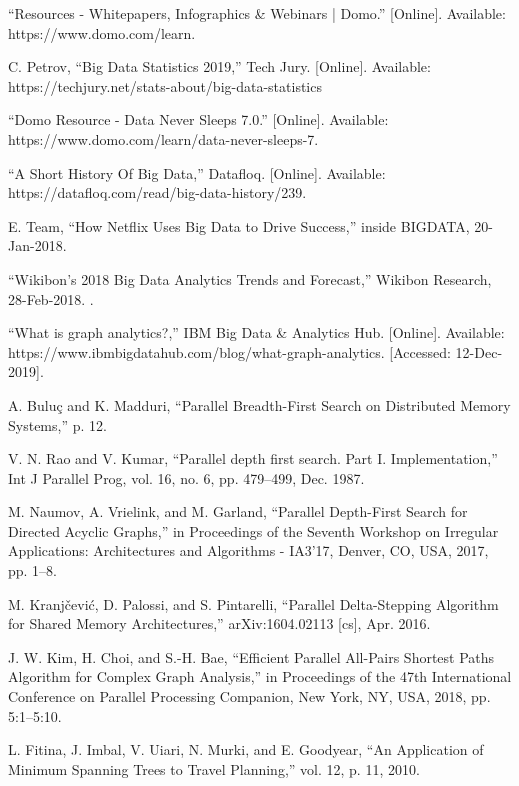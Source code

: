\documentclass[journal,twoside,web]{ieeecolor}
\begin{document}
\begin{thebibliography}{9}
    “Resources - Whitepapers, Infographics \& Webinars | Domo.” [Online]. Available: https://www.domo.com/learn.
    
    C. Petrov, “Big Data Statistics 2019,” Tech Jury. [Online]. Available: https://techjury.net/stats-about/big-data-statistics
    
    “Domo Resource - Data Never Sleeps 7.0.” [Online]. Available: https://www.domo.com/learn/data-never-sleeps-7.
    
    “A Short History Of Big Data,” Datafloq. [Online]. Available: https://datafloq.com/read/big-data-history/239.
    
    E. Team, “How Netflix Uses Big Data to Drive Success,” inside BIGDATA, 20-Jan-2018.
    
    “Wikibon’s 2018 Big Data Analytics Trends and Forecast,” Wikibon Research, 28-Feb-2018. .
    
    “What is graph analytics?,” IBM Big Data \& Analytics Hub. [Online]. Available: https://www.ibmbigdatahub.com/blog/what-graph-analytics. [Accessed: 12-Dec-2019].
    
    A. Buluç and K. Madduri, “Parallel Breadth-First Search on Distributed Memory Systems,” p. 12.
    
    V. N. Rao and V. Kumar, “Parallel depth first search. Part I. Implementation,” Int J Parallel Prog, vol. 16, no. 6, pp. 479–499, Dec. 1987.
    
    M. Naumov, A. Vrielink, and M. Garland, “Parallel Depth-First Search for Directed Acyclic Graphs,” in Proceedings of the Seventh Workshop on Irregular Applications: Architectures and Algorithms - IA3’17, Denver, CO, USA, 2017, pp. 1–8.
    
    M. Kranjčević, D. Palossi, and S. Pintarelli, “Parallel Delta-Stepping Algorithm for Shared Memory Architectures,” arXiv:1604.02113 [cs], Apr. 2016.
    
    J. W. Kim, H. Choi, and S.-H. Bae, “Efficient Parallel All-Pairs Shortest Paths Algorithm for Complex Graph Analysis,” in Proceedings of the 47th International Conference on Parallel Processing Companion, New York, NY, USA, 2018, pp. 5:1–5:10.
    
    L. Fitina, J. Imbal, V. Uiari, N. Murki, and E. Goodyear, “An Application of Minimum Spanning Trees to Travel Planning,” vol. 12, p. 11, 2010.
    

\end{thebibliography}
\end{document}
